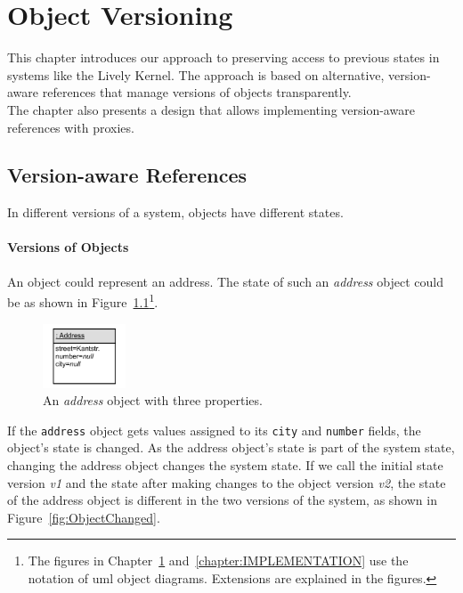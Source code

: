 \chapter{Object Versioning} \label{chapter:APPROACH}

This chapter introduces our approach to preserving access to previous states in systems like the Lively Kernel.
The approach is based on alternative, version-aware references that manage versions of objects transparently.\\
The chapter also presents a design that allows implementing version-aware references with proxies.


\section{Version-aware References} \label{sec:APPROACH:1}

In different versions of a system, objects have different states. 

\subsubsection{Versions of Objects}

An object could represent an address.
The state of such an \emph{address} object could be as shown in Figure~\ref{fig:SingleObject}\footnote{The figures in Chapter~\ref{chapter:APPROACH} and~\ref{chapter:IMPLEMENTATION} use the notation of \ac{uml} object diagrams. Extensions are explained in the figures.}.

\begin{figure}[h]
    \centering
    \includegraphics[width=0.22\textwidth]{figures/4_approach/1_singleObject.pdf}
    \caption{An \emph{address} object with three properties.}
    \label{fig:SingleObject}
\end{figure}

If the \lstinline{address} object gets values assigned to its \lstinline{city} and \lstinline{number} fields, the object's state is changed.
As the address object's state is part of the system state, changing the address object changes the system state.
If we call the initial state version \emph{v1} and the state after making changes to the object version \emph{v2}, the state of the address object is different in the two versions of the system, as shown in Figure~\ref{fig:ObjectChanged}.


